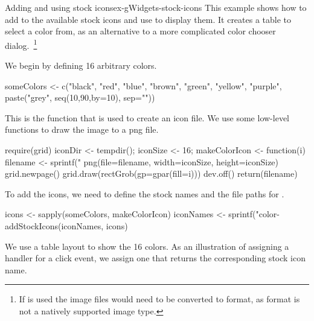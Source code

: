 \begin{example}{Adding and using stock icons}{ex-gWidgets-stock-icons}
This example shows how to add to the available stock icons and use
 to display them. It creates a table to select a color
from, as an alternative to a more complicated color chooser
dialog.~\footnote{If   is used the image files would need to be
converted to  format, as  format is not a natively
supported image type.}

We begin by defining 16 arbitrary colors.

\begin{Schunk}
\begin{Sinput}
 someColors <- c("black", "red", "blue", "brown",
                 "green", "yellow", "purple",
                 paste("grey", seq(10,90,by=10), sep=""))
\end{Sinput}
\end{Schunk}

This is the function that is used to create an icon file. We use some
low-level  functions to draw the image to a png file.
\begin{Schunk}
\begin{Sinput}
 require(grid)
 iconDir <- tempdir(); iconSize <- 16;
 makeColorIcon <- function(i) {
   filename <- sprintf("%
   png(file=filename, width=iconSize, height=iconSize)
   grid.newpage()
   grid.draw(rectGrob(gp=gpar(fill=i)))
   dev.off()
   return(filename)
 }
\end{Sinput}
\end{Schunk}

To add the icons, we need to define the stock names and the file paths
for .

\begin{Schunk}
\begin{Sinput}
 icons <- sapply(someColors, makeColorIcon)
 iconNames <- sprintf("color-%
 addStockIcons(iconNames, icons)
\end{Sinput}
\end{Schunk}

We use a table layout to show the 16 colors. As an illustration of
assigning a handler for a click event, we assign one that returns the
corresponding stock icon name.

\begin{Schunk}
\end{Schunk}
\end{example}

